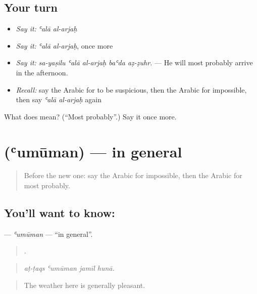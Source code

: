 \subsection*{Your turn}
\begin{itemize}
\raggedright
  \item \emph{Say it:} \emph{ʿalā al-arjaḥ}
  \item \emph{Say it:} \emph{ʿalā al-arjaḥ}, once more
  \item \emph{Say it:} \emph{sa-yaṣilu ʿalā al-arjaḥ baʿda aẓ-ẓuhr.} — He will most probably arrive in the afternoon.
  \item \emph{Recall:} say the Arabic for to be suspicious, then the Arabic for impossible, then say \emph{ʿalā al-arjaḥ} again
\end{itemize}

\begin{tcolorbox}[breakable,colback=teal!4,colframe=teal!35!black,title={Before you move on}]
What does   mean? (\textquotedblleft{}Most probably\textquotedblright{}.) Say it once more.
\end{tcolorbox}
\section[\texorpdfstring{\ar{عموما} (ʿumūman)}{عموما (ʿumūman)}]{ (ʿumūman) — in general}

\label{lesson:AR-C403-umuman}



\begin{quote}
Before the new one: say the Arabic for impossible, then the Arabic for most probably.
\end{quote}

\subsection*{You'll want to know: }
\textbf{} — \emph{ʿumūman} — \textquotedblleft{}in general\textquotedblright{}.

\begin{quote}
   .
\end{quote}

\begin{quote}
\emph{aṭ-ṭaqs ʿumūman jamīl hunā.}
\end{quote}

\begin{quote}
The weather here is generally pleasant.
\end{quote}

